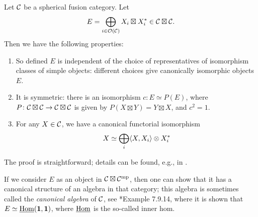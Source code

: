 \begin{lemma}\label{l:spherical-E}
  Let $\mathcal{C}$ be a spherical fusion category. Let
  \begin{equation}\label{e:spherical-E}
    E = \bigoplus_{i\in \mathcal{O}(\mathcal{C})} X_i\boxtimes X_i^*\in \mathcal{C}\boxtimes\mathcal{C}.
  \end{equation}
  Then we have the following properties:
  \begin{enumerate}
    \item So defined $E$ is independent of the choice of representatives of
    isomorphism classes of simple objects: different choices give canonically
    isomorphic objects $E$.

    \item It is symmetric: there is an isomorphism $c\colon E\simeq P(E)$, where
    $P \colon \mathcal{C}\boxtimes\mathcal{C} \to \mathcal{C}\boxtimes \mathcal{C}$ is given by
    $P(X\boxtimes Y)= Y\boxtimes X$, and $c^2=1$.

    \item For any $X\in \mathcal{C}$, we have a canonical functorial isomorphism
    $$
      X \simeq \bigoplus_i\langle X, X_i\rangle\otimes X_i^*
    $$
  \end{enumerate}
\end{lemma}
 The proof  is straightforward; details can be found, e.g.,
  in .
\begin{remark}
  If we consider $E$ as an object in $\mathcal{C}\boxtimes\mathcal{C}^{\mathrm{mp}}$, then one can
  show that it has a canonical structure of an algebra in that category; this
  algebra is sometimes called the \emph{canonical algebra} of $\mathcal{C}$, see
  *{Example 7.9.14}, where it is shown that $E\simeq
  \underline{\operatorname{Hom}}(\mathbf{1},\mathbf{1})$, where $\underline{\operatorname{Hom}}$ is the so-called inner
  hom.
\end{remark}

